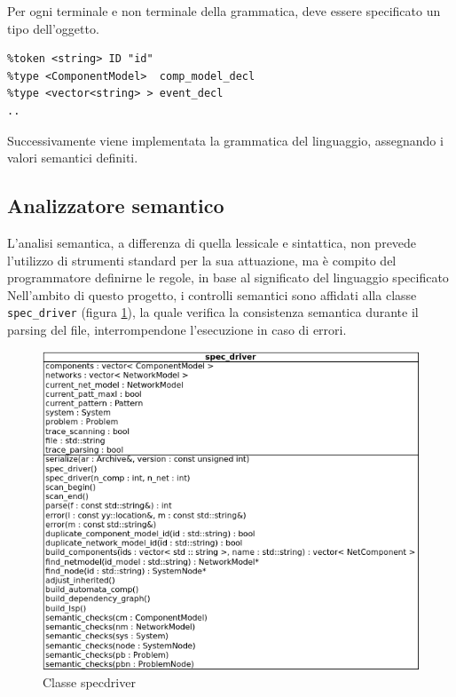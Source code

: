 Per ogni terminale e non terminale della grammatica, deve essere specificato un tipo dell'oggetto.

\begin{verbatim}
%token <string> ID "id"
%type <ComponentModel>  comp_model_decl
%type <vector<string> > event_decl
..
\end{verbatim}

Successivamente viene implementata la grammatica del linguaggio, assegnando i valori semantici definiti.

\subsection{Analizzatore semantico}
L'analisi semantica, a differenza di quella lessicale e sintattica, non prevede l'utilizzo di strumenti standard per la sua attuazione, ma è compito del programmatore definirne le regole, in base al significato del linguaggio specificato Nell'ambito di questo progetto, i controlli semantici sono affidati alla classe \verb|spec_driver| (figura \ref{fig:driver}), la quale verifica la consistenza semantica durante il parsing del file, interrompendone l'esecuzione in caso di errori. 

\begin{figure}[htbp]
\centering
\includegraphics[scale=0.6]{./Img/implementazione/driver.png}
\caption{Classe specdriver}
\label{fig:driver}
\end{figure}

